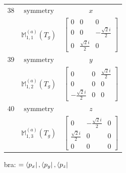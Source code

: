 \documentclass[fleqn,8pt,landscape]{jsarticle}
\begin{document}
\begin{longtable}{ccc}
$ 38 $ & $ \text{symmetry} $ & $ x $ \\
$  $ & $ \mathbb{M}_{1,1}^{(a)}(T_{g}) $ & $ \begin{bmatrix} 0 & 0 & 0 \\ 0 & 0 & - \frac{\sqrt{2} i}{2} \\ 0 & \frac{\sqrt{2} i}{2} & 0 \end{bmatrix} $ \\ \hline
$ 39 $ & $ \text{symmetry} $ & $ y $ \\
$  $ & $ \mathbb{M}_{1,2}^{(a)}(T_{g}) $ & $ \begin{bmatrix} 0 & 0 & \frac{\sqrt{2} i}{2} \\ 0 & 0 & 0 \\ - \frac{\sqrt{2} i}{2} & 0 & 0 \end{bmatrix} $ \\ \hline
$ 40 $ & $ \text{symmetry} $ & $ z $ \\
$  $ & $ \mathbb{M}_{1,3}^{(a)}(T_{g}) $ & $ \begin{bmatrix} 0 & - \frac{\sqrt{2} i}{2} & 0 \\ \frac{\sqrt{2} i}{2} & 0 & 0 \\ 0 & 0 & 0 \end{bmatrix} $ \\ \hline
\end{longtable}
bra: $=\bra{p_{x}}, \bra{p_{y}}, \bra{p_{z}}$
\end{document}
